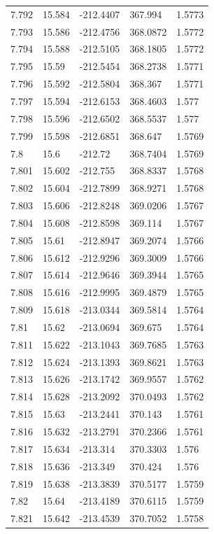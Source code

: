 \begin{tabular}{lllll}
7.792 & 15.584 & -212.4407 & 367.994 & 1.5773 \\
7.793 & 15.586 & -212.4756 & 368.0872 & 1.5772 \\
7.794 & 15.588 & -212.5105 & 368.1805 & 1.5772 \\
7.795 & 15.59 & -212.5454 & 368.2738 & 1.5771 \\
7.796 & 15.592 & -212.5804 & 368.367 & 1.5771 \\
7.797 & 15.594 & -212.6153 & 368.4603 & 1.577 \\
7.798 & 15.596 & -212.6502 & 368.5537 & 1.577 \\
7.799 & 15.598 & -212.6851 & 368.647 & 1.5769 \\
7.8 & 15.6 & -212.72 & 368.7404 & 1.5769 \\
7.801 & 15.602 & -212.755 & 368.8337 & 1.5768 \\
7.802 & 15.604 & -212.7899 & 368.9271 & 1.5768 \\
7.803 & 15.606 & -212.8248 & 369.0206 & 1.5767 \\
7.804 & 15.608 & -212.8598 & 369.114 & 1.5767 \\
7.805 & 15.61 & -212.8947 & 369.2074 & 1.5766 \\
7.806 & 15.612 & -212.9296 & 369.3009 & 1.5766 \\
7.807 & 15.614 & -212.9646 & 369.3944 & 1.5765 \\
7.808 & 15.616 & -212.9995 & 369.4879 & 1.5765 \\
7.809 & 15.618 & -213.0344 & 369.5814 & 1.5764 \\
7.81 & 15.62 & -213.0694 & 369.675 & 1.5764 \\
7.811 & 15.622 & -213.1043 & 369.7685 & 1.5763 \\
7.812 & 15.624 & -213.1393 & 369.8621 & 1.5763 \\
7.813 & 15.626 & -213.1742 & 369.9557 & 1.5762 \\
7.814 & 15.628 & -213.2092 & 370.0493 & 1.5762 \\
7.815 & 15.63 & -213.2441 & 370.143 & 1.5761 \\
7.816 & 15.632 & -213.2791 & 370.2366 & 1.5761 \\
7.817 & 15.634 & -213.314 & 370.3303 & 1.576 \\
7.818 & 15.636 & -213.349 & 370.424 & 1.576 \\
7.819 & 15.638 & -213.3839 & 370.5177 & 1.5759 \\
7.82 & 15.64 & -213.4189 & 370.6115 & 1.5759 \\
7.821 & 15.642 & -213.4539 & 370.7052 & 1.5758 \\

\end{tabular}
